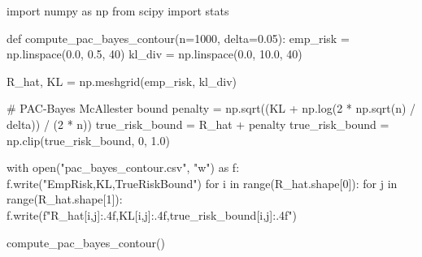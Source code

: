 \begin{pycode}
import numpy as np
from scipy import stats

def compute_pac_bayes_contour(n=1000, delta=0.05):
    emp_risk = np.linspace(0.0, 0.5, 40)
    kl_div = np.linspace(0.0, 10.0, 40)
    
    R_hat, KL = np.meshgrid(emp_risk, kl_div)
    
    # PAC-Bayes McAllester bound
    penalty = np.sqrt((KL + np.log(2 * np.sqrt(n) / delta)) / (2 * n))
    true_risk_bound = R_hat + penalty
    true_risk_bound = np.clip(true_risk_bound, 0, 1.0)
    
    with open("pac_bayes_contour.csv", "w") as f:
        f.write("EmpRisk,KL,TrueRiskBound\n")
        for i in range(R_hat.shape[0]):
            for j in range(R_hat.shape[1]):
                f.write(f"{R_hat[i,j]:.4f},{KL[i,j]:.4f},{true_risk_bound[i,j]:.4f}\n")

compute_pac_bayes_contour()
\end{pycode}
